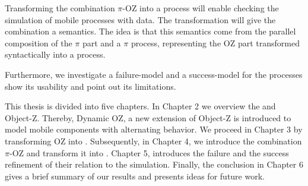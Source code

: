  Transforming the combination $\pi$-OZ into a \picalc{} process will enable checking the simulation of mobile processes with data. The transformation will give the combination a \picalc{} semantics. The idea is that this semantics come from the parallel composition of the $\pi$ part and a $\pi$ process, representing the OZ part transformed syntactically into a \picalc{} process.

 Furthermore, we investigate a failure-model and a success-model for the \picalc{} processes show its usability and point out its limitations.

This thesis is divided into five chapters. In Chapter 2 we overview the \picalc{} and Object-Z. Thereby, Dynamic OZ, a new extension of Object-Z is introduced to model mobile components with alternating behavior. We proceed in Chapter 3 by transforming OZ into \picalc{}. Subsequently, in Chapter 4, we introduce the combination $\pi$-OZ and transform it into \picalc{}. Chapter 5, introduces the failure and the success refinement of \picalc{} their relation to the simulation. Finally, the conclusion in Chapter 6 gives a brief summary of our results and presents ideas for future work.

